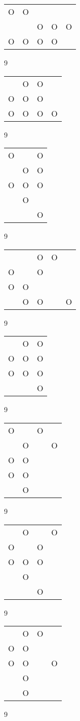 \begin{tabular}{|m{0.2cm}m{0.2cm}m{0.2cm}m{0.2cm}m{0.2cm}|}\hline
O&O& & & \\
 & &O&O&O\\
O&O&O&O& \\
\hline\end{tabular}9
\begin{tabular}{|m{0.2cm}m{0.2cm}m{0.2cm}m{0.2cm}|}\hline
 &O&O& \\
O&O&O& \\
O&O&O&O\\
\hline\end{tabular}9
\begin{tabular}{|m{0.2cm}m{0.2cm}m{0.2cm}|}\hline
O& &O\\
 &O&O\\
O&O&O\\
 &O& \\
 & &O\\
\hline\end{tabular}9
\begin{tabular}{|m{0.2cm}m{0.2cm}m{0.2cm}m{0.2cm}m{0.2cm}|}\hline
 & &O&O& \\
O& &O& & \\
O&O& & & \\
 &O&O& &O\\
\hline\end{tabular}9
\begin{tabular}{|m{0.2cm}m{0.2cm}m{0.2cm}|}\hline
 &O&O\\
O&O&O\\
O&O&O\\
 & &O\\
\hline\end{tabular}9
\begin{tabular}{|m{0.2cm}m{0.2cm}m{0.2cm}m{0.2cm}|}\hline
O& &O& \\
 &O& &O\\
O&O& & \\
O&O& & \\
 &O& & \\
\hline\end{tabular}9
\begin{tabular}{|m{0.2cm}m{0.2cm}m{0.2cm}m{0.2cm}|}\hline
 &O& &O\\
O& &O& \\
O&O&O& \\
 &O& & \\
 & &O& \\
\hline\end{tabular}9
\begin{tabular}{|m{0.2cm}m{0.2cm}m{0.2cm}m{0.2cm}|}\hline
 &O&O& \\
O&O& & \\
O&O& &O\\
 &O& & \\
 &O& & \\
\hline\end{tabular}9
